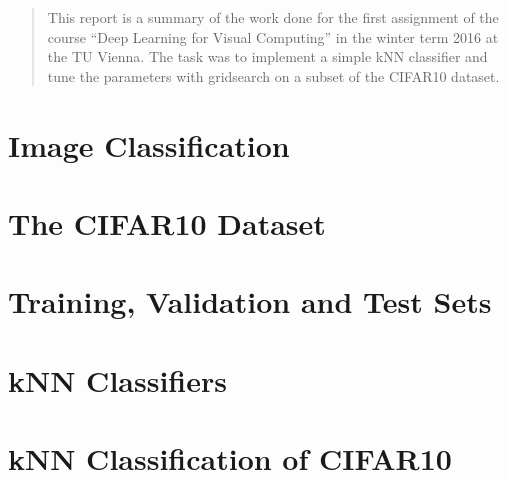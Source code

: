 \newcommand{\ttitle}{kNN Classification and Histograms of Oriented Gradients}
\hyphenation{}
\maketitle



\begin{abstract}
This report is a summary of the work done for the first assignment of the course ``Deep Learning for Visual Computing'' in the winter term 2016 at the TU Vienna. The task was to implement a simple kNN classifier and tune the parameters with gridsearch on a subset of the CIFAR10 dataset.
\end{abstract}



\section{Image Classification} %

\section{The CIFAR10 Dataset} %

\section{Training, Validation and Test Sets} %

\section{kNN Classifiers} %

\clearpage
\section{kNN Classification of CIFAR10} %

